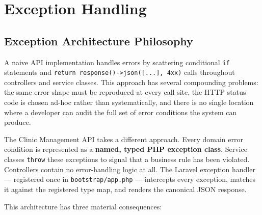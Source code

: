 \chapter{Exception Handling}
\label{chap:exceptions}


\section{Exception Architecture Philosophy}
\label{sec:exception-philosophy}

A naive API implementation handles errors by scattering conditional
\texttt{if} statements and \texttt{return response()->json([...], 4xx)}
calls throughout controllers and service classes. This approach has
several compounding problems: the same error shape must be reproduced at
every call site, the HTTP status code is chosen ad-hoc rather than
systematically, and there is no single location where a developer can
audit the full set of error conditions the system can produce.

The Clinic Management API takes a different approach. Every domain error
condition is represented as a \textbf{named, typed PHP exception class}.
Service classes \texttt{throw} these exceptions to signal that a business
rule has been violated. Controllers contain no error-handling logic at
all. The Laravel exception handler --- registered once in
\texttt{bootstrap/app.php} --- intercepts every exception, matches it
against the registered type map, and renders the canonical JSON response.

This architecture has three material consequences:

